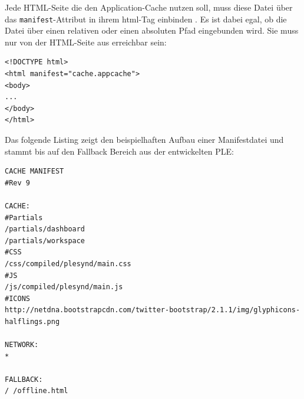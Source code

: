 Jede HTML-Seite die den Application-Cache nutzen soll, muss diese Datei über das \texttt{manifest}-Attribut in ihrem html-Tag einbinden \cite{html5upandrunningchapter8}. Es ist dabei egal, ob die Datei über einen relativen oder einen absoluten Pfad eingebunden wird. Sie muss nur von der HTML-Seite aus erreichbar sein:
\begin{lstlisting}
<!DOCTYPE html>
<html manifest="cache.appcache">
<body>
...
</body>
</html>
\end{lstlisting}

Das folgende Listing zeigt den beispielhaften Aufbau einer Manifestdatei und stammt bis auf den Fallback Bereich aus der entwickelten PLE:
\begin{lstlisting}
CACHE MANIFEST
#Rev 9

CACHE:
#Partials
/partials/dashboard
/partials/workspace
#CSS
/css/compiled/plesynd/main.css
#JS
/js/compiled/plesynd/main.js
#ICONS
http://netdna.bootstrapcdn.com/twitter-bootstrap/2.1.1/img/glyphicons-halflings.png

NETWORK:
*

FALLBACK:
/ /offline.html
\end{lstlisting}

